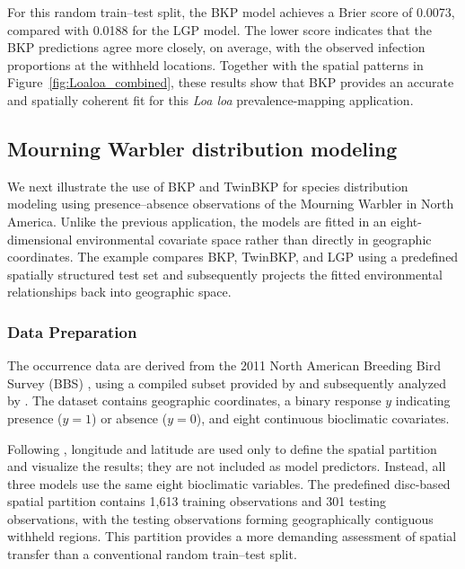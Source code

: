 \documentclass[article, shortnames]{jss}
\begin{document}
For this random train--test split, the BKP model achieves a Brier score of 0.0073, compared with 0.0188 for the LGP model.
The lower score indicates that the BKP predictions agree more closely, on average, with the observed infection proportions at the withheld locations.
Together with the spatial patterns in Figure~\ref{fig:Loaloa_combined}, these results show that BKP provides an accurate and spatially coherent fit for this \emph{Loa loa} prevalence-mapping application.

\subsection{Mourning Warbler distribution modeling}\label{sec:warbler}

We next illustrate the use of BKP and TwinBKP for species distribution modeling using presence--absence observations of the Mourning Warbler in North America.
Unlike the previous application, the models are fitted in an eight-dimensional environmental covariate space rather than directly in geographic coordinates.
The example compares BKP, TwinBKP, and LGP using a predefined spatially structured test set and subsequently projects the fitted environmental relationships back into geographic space.

\subsubsection{Data Preparation} 

The occurrence data are derived from the 2011 North American Breeding Bird Survey (BBS) \citep{sauer2014north}, using a compiled subset provided by \citet{harris2015generating} and subsequently analyzed by \citet{golding2016fast}.
The dataset contains geographic coordinates, a binary response $y$ indicating presence ($y=1$) or absence ($y=0$), and eight continuous bioclimatic covariates.

Following \citet{golding2016fast}, longitude and latitude are used only to define the spatial partition and visualize the results; they are not included as model predictors.
Instead, all three models use the same eight bioclimatic variables.
The predefined disc-based spatial partition contains 1,613 training observations and 301 testing observations, with the testing observations forming geographically contiguous withheld regions.
This partition provides a more demanding assessment of spatial transfer than a conventional random train--test split.
\end{document}
